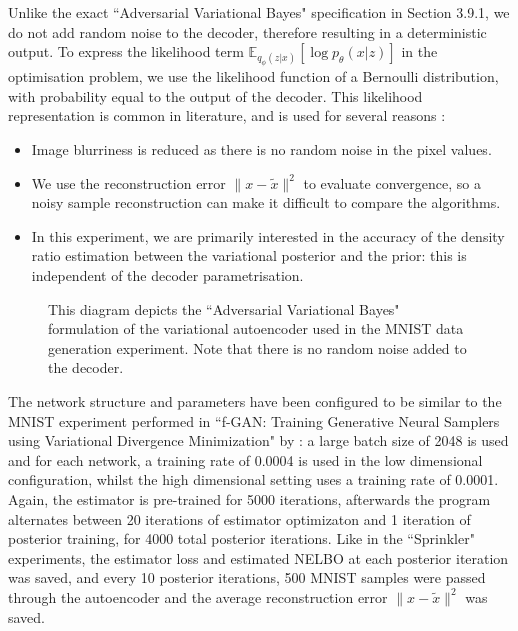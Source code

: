 \documentclass[honours,12pt]{unswthesis}
\newcommand{\E}{\mathbb{E}}
\numberwithin{equation}{section}
\theoremstyle{definition}
\begin{document}
Unlike the exact ``Adversarial Variational Bayes" specification in Section 3.9.1, we do not add random noise to the decoder, therefore resulting in a deterministic output. To express the likelihood term $\E_{q_\phi(z|x)}[\log p_\theta(x|z)]$ in the optimisation problem, we use the likelihood function of a Bernoulli distribution, with probability equal to the output of the decoder. This likelihood representation is common in literature, and is used for several reasons \citep{nowozin,bgan, tiao}:
\begin{itemize}
\item Image blurriness is reduced as there is no random noise in the pixel values.
\item We use the reconstruction error $\|x-\tilde{x}\|^2$ to evaluate convergence, so a noisy sample reconstruction can make it difficult to compare the algorithms.
\item In this experiment, we are primarily interested in the accuracy of the density ratio estimation between the variational posterior and the prior: this is independent of the decoder parametrisation.
\end{itemize}
\begin{figure}[h]
  \centering
   \caption{\small This diagram depicts the ``Adversarial Variational Bayes" formulation of the variational autoencoder used in the MNIST data generation experiment. Note that there is no random noise added to the decoder.}
\end{figure}

The network structure and parameters have been configured to be similar to the MNIST experiment performed in ``f-GAN: Training Generative Neural Samplers using Variational Divergence Minimization" by \citet{nowozin}: a large batch size of 2048 is used and for each network, a training rate of 0.0004 is used in the low dimensional configuration, whilst the high dimensional setting uses a training rate of 0.0001. Again, the estimator is pre-trained for 5000 iterations, afterwards the program alternates between 20 iterations of estimator optimizaton and 1 iteration of posterior training, for 4000 total posterior iterations. Like in the ``Sprinkler" experiments, the estimator loss and estimated NELBO at each posterior iteration was saved, and every 10 posterior iterations, 500 MNIST samples were passed through the autoencoder and the average reconstruction error $\|x-\tilde{x}\|^2$ was saved.
\end{document}
